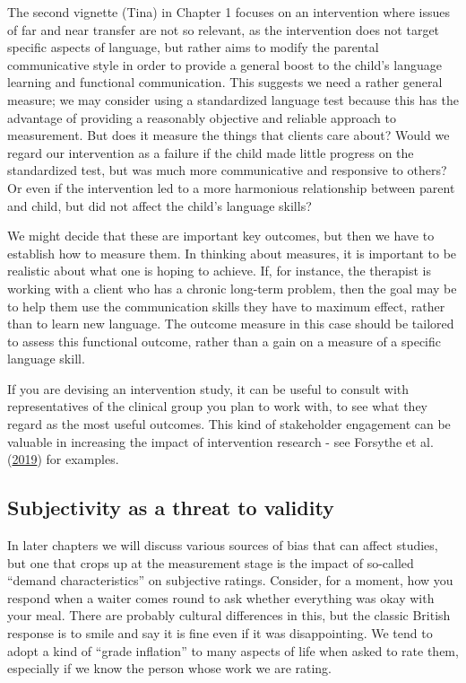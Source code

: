 \documentclass{krantz}
\begin{document}
The second vignette (Tina) in Chapter 1 focuses on an intervention where issues of far and near transfer are not so relevant, as the intervention does not target specific aspects of language, but rather aims to modify the parental communicative style in order to provide a general boost to the child's language learning and functional communication. This suggests we need a rather general measure; we may consider using a standardized language test because this has the advantage of providing a reasonably objective and reliable approach to measurement. But does it measure the things that clients care about? Would we regard our intervention as a failure if the child made little progress on the standardized test, but was much more communicative and responsive to others? Or even if the intervention led to a more harmonious relationship between parent and child, but did not affect the child's language skills?

We might decide that these are important key outcomes, but then we have to establish how to measure them. In thinking about measures, it is important to be realistic about what one is hoping to achieve. If, for instance, the therapist is working with a client who has a chronic long-term problem, then the goal may be to help them use the communication skills they have to maximum effect, rather than to learn new language. The outcome measure in this case should be tailored to assess this functional outcome, rather than a gain on a measure of a specific language skill.

If you are devising an intervention study, it can be useful to consult with representatives of the clinical group you plan to work with, to see what they regard as the most useful outcomes. This kind of stakeholder engagement can be valuable
 in increasing the impact of intervention research - see Forsythe et al. (\protect\hyperlink{ref-forsythe2019}{2019}) for examples.

\hypertarget{subjectivity-as-a-threat-to-validity}{%
\subsection{Subjectivity as a threat to validity}\label{subjectivity-as-a-threat-to-validity}}

In later chapters we will discuss various sources of bias that can affect studies, but one that crops up at the measurement stage is the impact of so-called ``demand characteristics'' on subjective ratings. Consider, for a moment, how you respond when a waiter comes round to ask whether everything was okay with your meal. There are probably cultural differences in this, but the classic British response is to smile and say it is fine even if it was disappointing. We tend to adopt a kind of ``grade inflation'' to many aspects of life when asked to rate them, especially if we know the person whose work we are rating.
\end{document}
